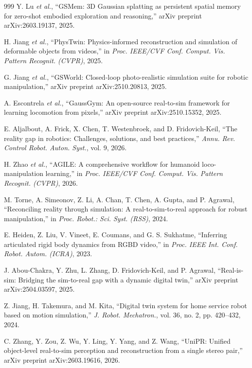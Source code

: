 \documentclass[12pt,a4paper,oneside]{report}
\begin{document}
\begin{thebibliography}{999}
Y. Lu \textit{et al.}, ``{GSMem}: {3D} Gaussian splatting as persistent spatial memory for zero-shot embodied exploration and reasoning,'' arXiv preprint arXiv:2603.19137, 2025.

H. Jiang \textit{et al.}, ``PhysTwin: Physics-informed reconstruction and simulation of deformable objects from videos,'' in \textit{Proc. IEEE/CVF Conf. Comput. Vis. Pattern Recognit. (CVPR)}, 2025.

G. Jiang \textit{et al.}, ``{GSWorld}: Closed-loop photo-realistic simulation suite for robotic manipulation,'' arXiv preprint arXiv:2510.20813, 2025.

A. Escontrela \textit{et al.}, ``{GaussGym}: An open-source real-to-sim framework for learning locomotion from pixels,'' arXiv preprint arXiv:2510.15352, 2025.

E. Aljalbout, A. Frick, X. Chen, T. Westenbroek, and D. Fridovich-Keil, ``The reality gap in robotics: Challenges, solutions, and best practices,'' \textit{Annu. Rev. Control Robot. Auton. Syst.}, vol. 9, 2026.

H. Zhao \textit{et al.}, ``{AGILE}: A comprehensive workflow for humanoid loco-manipulation learning,'' in \textit{Proc. IEEE/CVF Conf. Comput. Vis. Pattern Recognit. (CVPR)}, 2026.

M. Torne, A. Simeonov, Z. Li, A. Chan, T. Chen, A. Gupta, and P. Agrawal, ``Reconciling reality through simulation: A real-to-sim-to-real approach for robust manipulation,'' in \textit{Proc. Robot.: Sci. Syst. (RSS)}, 2024.

E. Heiden, Z. Liu, V. Vineet, E. Coumans, and G. S. Sukhatme, ``Inferring articulated rigid body dynamics from RGBD video,'' in \textit{Proc. IEEE Int. Conf. Robot. Autom. (ICRA)}, 2023.

J. Abou-Chakra, Y. Zhu, L. Zhang, D. Fridovich-Keil, and P. Agrawal, ``Real-is-sim: Bridging the sim-to-real gap with a dynamic digital twin,'' arXiv preprint arXiv:2504.03597, 2025.

Z. Jiang, H. Takemura, and M. Kita, ``Digital twin system for home service robot based on motion simulation,'' \textit{J. Robot. Mechatron.}, vol. 36, no. 2, pp. 420--432, 2024.

C. Zhang, Y. Zou, Z. Wu, Y. Ling, Y. Yang, and Z. Wang, ``{UniPR}: Unified object-level real-to-sim perception and reconstruction from a single stereo pair,'' arXiv preprint arXiv:2603.19616, 2026.


\end{thebibliography}
\end{document}
